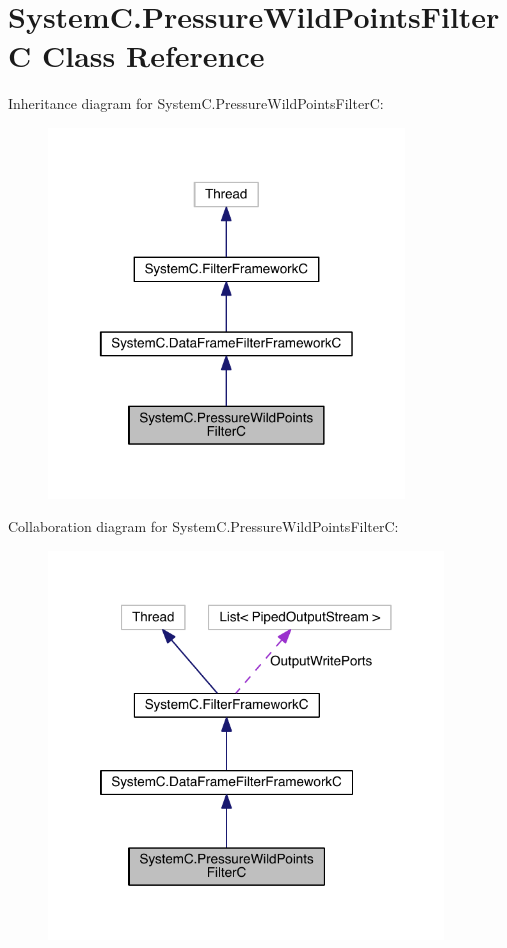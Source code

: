 \hypertarget{class_system_c_1_1_pressure_wild_points_filter_c}{}\section{System\+C.\+Pressure\+Wild\+Points\+Filter\+C Class Reference}
\label{class_system_c_1_1_pressure_wild_points_filter_c}


Inheritance diagram for System\+C.\+Pressure\+Wild\+Points\+Filter\+C\+:
\nopagebreak
\begin{figure}[H]
\begin{center}
\leavevmode
\includegraphics[width=268pt]{class_system_c_1_1_pressure_wild_points_filter_c__inherit__graph}
\end{center}
\end{figure}


Collaboration diagram for System\+C.\+Pressure\+Wild\+Points\+Filter\+C\+:
\nopagebreak
\begin{figure}[H]
\begin{center}
\leavevmode
\includegraphics[width=297pt]{class_system_c_1_1_pressure_wild_points_filter_c__coll__graph}
\end{center}
\end{figure}
